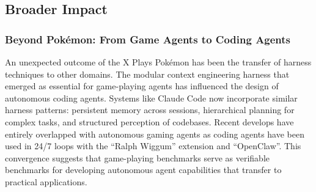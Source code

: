 \subsection{Broader Impact}


\subsubsection{Beyond Pokémon: From Game Agents to Coding Agents}

An unexpected outcome of the X Plays Pokémon has been the transfer of harness techniques to other domains. The modular context engineering harness that emerged as essential for game-playing agents has influenced the design of autonomous coding agents. Systems like Claude Code now incorporate similar harness patterns: persistent memory across sessions, hierarchical planning for complex tasks, and structured perception of codebases. Recent develops have entirely overlapped with autonomous gaming agents as coding agents have been used in 24/7 loops with the ``Ralph Wiggum'' extension and ``OpenClaw''. This convergence suggests that game-playing benchmarks serve as verifiable benchmarks for developing autonomous agent capabilities that transfer to practical applications.
